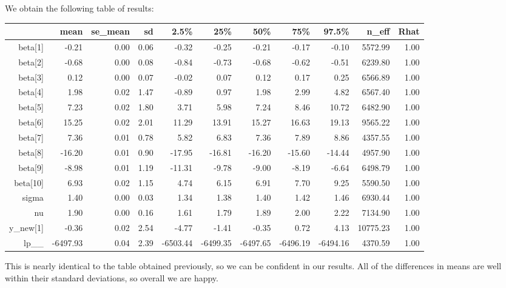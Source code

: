 \documentclass[10pt]{extarticle}
\begin{document}
We obtain the following table of results: 

\begin{table}[ht]
	\tiny
	\centering
	\begin{tabular}{rrrrrrrrrrr}
		\hline
		& mean & se\_mean & sd & 2.5\% & 25\% & 50\% & 75\% & 97.5\% & n\_eff & Rhat \\ 
		\hline
		beta[1] & -0.21 & 0.00 & 0.06 & -0.32 & -0.25 & -0.21 & -0.17 & -0.10 & 5572.99 & 1.00 \\ 
		beta[2] & -0.68 & 0.00 & 0.08 & -0.84 & -0.73 & -0.68 & -0.62 & -0.51 & 6239.80 & 1.00 \\ 
		beta[3] & 0.12 & 0.00 & 0.07 & -0.02 & 0.07 & 0.12 & 0.17 & 0.25 & 6566.89 & 1.00 \\ 
		beta[4] & 1.98 & 0.02 & 1.47 & -0.89 & 0.97 & 1.98 & 2.99 & 4.82 & 6567.40 & 1.00 \\ 
		beta[5] & 7.23 & 0.02 & 1.80 & 3.71 & 5.98 & 7.24 & 8.46 & 10.72 & 6482.90 & 1.00 \\ 
		beta[6] & 15.25 & 0.02 & 2.01 & 11.29 & 13.91 & 15.27 & 16.63 & 19.13 & 9565.22 & 1.00 \\ 
		beta[7] & 7.36 & 0.01 & 0.78 & 5.82 & 6.83 & 7.36 & 7.89 & 8.86 & 4357.55 & 1.00 \\ 
		beta[8] & -16.20 & 0.01 & 0.90 & -17.95 & -16.81 & -16.20 & -15.60 & -14.44 & 4957.90 & 1.00 \\ 
		beta[9] & -8.98 & 0.01 & 1.19 & -11.31 & -9.78 & -9.00 & -8.19 & -6.64 & 6498.79 & 1.00 \\ 
		beta[10] & 6.93 & 0.02 & 1.15 & 4.74 & 6.15 & 6.91 & 7.70 & 9.25 & 5590.50 & 1.00 \\ 
		sigma & 1.40 & 0.00 & 0.03 & 1.34 & 1.38 & 1.40 & 1.42 & 1.46 & 6930.44 & 1.00 \\ 
		nu & 1.90 & 0.00 & 0.16 & 1.61 & 1.79 & 1.89 & 2.00 & 2.22 & 7134.90 & 1.00 \\ 
		y\_new[1] & -0.36 & 0.02 & 2.54 & -4.77 & -1.41 & -0.35 & 0.72 & 4.13 & 10775.23 & 1.00 \\ 
		lp\_\_ & -6497.93 & 0.04 & 2.39 & -6503.44 & -6499.35 & -6497.65 & -6496.19 & -6494.16 & 4370.59 & 1.00 \\ 
		\hline
	\end{tabular}
\end{table}

This is nearly identical to the table obtained previously, so we can be confident in our results. All of the differences in means are well within their standard deviations, so overall we are happy.
\end{document}
